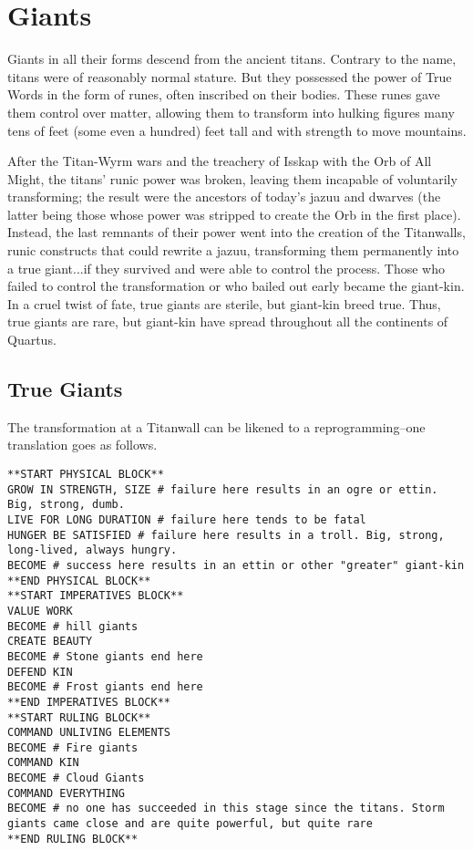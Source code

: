\clearpage
\section{Giants}
Giants in all their forms descend from the ancient titans. Contrary to the name, titans were of reasonably normal stature. But they possessed the power of True Words in the form of runes, often inscribed on their bodies. These runes gave them control over matter, allowing them to transform into hulking figures many tens of feet (some even a hundred) feet tall and with strength to move mountains.

After the Titan-Wyrm wars and the treachery of Isskap with the Orb of All Might, the titans' runic power was broken, leaving them incapable of voluntarily transforming; the result were the ancestors of today's jazuu and dwarves (the latter being those whose power was stripped to create the Orb in the first place). Instead, the last remnants of their power went into the creation of the Titanwalls, runic constructs that could rewrite a jazuu, transforming them permanently into a true giant...if they survived and were able to control the process. Those who failed to control the transformation or who bailed out early became the giant-kin. In a cruel twist of fate, true giants are sterile, but giant-kin breed true. Thus, true giants are rare, but giant-kin have spread throughout all the continents of Quartus.
\subsection{True Giants}
The transformation at a Titanwall can be likened to a reprogramming--one translation goes as follows.
\begin{verbatim}
**START PHYSICAL BLOCK**
GROW IN STRENGTH, SIZE # failure here results in an ogre or ettin. Big, strong, dumb. 
LIVE FOR LONG DURATION # failure here tends to be fatal
HUNGER BE SATISFIED # failure here results in a troll. Big, strong, long-lived, always hungry.
BECOME # success here results in an ettin or other "greater" giant-kin
**END PHYSICAL BLOCK**
**START IMPERATIVES BLOCK**
VALUE WORK
BECOME # hill giants
CREATE BEAUTY
BECOME # Stone giants end here
DEFEND KIN
BECOME # Frost giants end here
**END IMPERATIVES BLOCK**
**START RULING BLOCK**
COMMAND UNLIVING ELEMENTS
BECOME # Fire giants
COMMAND KIN
BECOME # Cloud Giants
COMMAND EVERYTHING
BECOME # no one has succeeded in this stage since the titans. Storm giants came close and are quite powerful, but quite rare
**END RULING BLOCK**
\end{verbatim}

